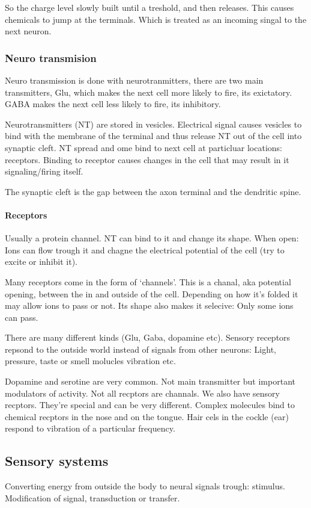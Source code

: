 \documentclass{article}
\begin{document}
So the charge level slowly built until a treshold, and then releases. This
causes chemicals to jump at the terminals. Which is treated as an incoming
singal to the next neuron.

\subsubsection{Neuro transmision}
Neuro transmission is done with neurotranmitters, there are two main
transmitters, Glu, which makes the next cell more likely to fire, its
exictatory. GABA makes the next cell less likely to fire, its inhibitory.

Neurotransmitters (NT) are stored in vesicles. Electrical signal causes
vesicles to bind with the membrane of the terminal and thus release NT
out of the cell into synaptic cleft. NT spread and ome bind to next
cell at particluar locations: receptors. Binding to receptor causes
changes in the cell that may result in it signaling/firing itself.

The synaptic cleft is the gap between the axon terminal and
the dendritic spine.

\paragraph{Receptors} Usually a protein channel. NT can bind to it
and change its shape. When open: Ions can flow trough it and
chagne the electrical potential of the cell (try to excite or
inhibit it).

Many receptors come in the form of `channels'. This is a chanal,
aka potential opening, between the in and outside of the cell.
Depending on how it's folded it may allow ions to pass or not.
Its shape also makes it selecive: Only some ions can pass.

There are many different kinds (Glu, Gaba, dopamine etc).
Sensory receptors repsond to the outside world instead of signals
from other neurons: Light, pressure, taste or smell molucles vibration etc.

Dopamine and serotine are very common. Not main transmitter but important
modulators of activity. Not all recptors are channals. We also have sensory
recptors. They're special and can be very different. Complex molecules bind
to chemical recptors in the nose and on the tongue. Hair cels in the cockle
(ear) respond to vibration of a particular frequency.

\subsection{Sensory systems}
Converting energy from outside the body to neural signals trough: stimulus.
Modification of signal, transduction  or transfer.
\end{document}
